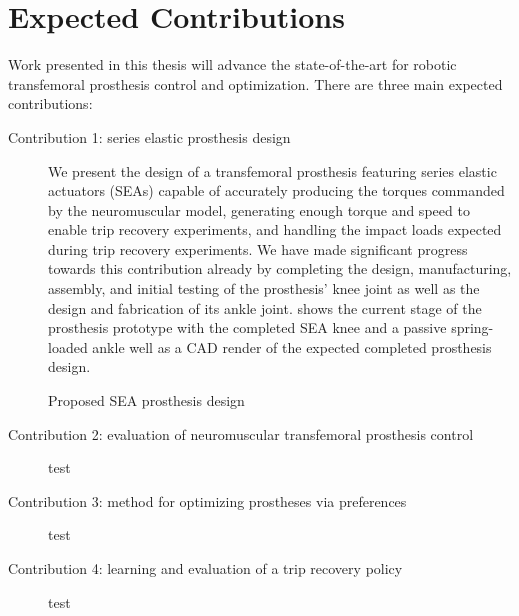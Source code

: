 \section{Expected Contributions}

Work presented in this thesis will advance the state-of-the-art for robotic
transfemoral prosthesis control and optimization. There are three main expected 
contributions: 

\begin{description}
    \item[Contribution 1: series elastic prosthesis design] We present the
    design of a transfemoral prosthesis featuring series elastic actuators
    (SEAs) capable of accurately producing the torques commanded by the
    neuromuscular model, generating enough torque and speed to enable trip
    recovery experiments, and handling the impact loads expected during trip
    recovery experiments. We have made significant progress towards this
    contribution already by completing the design, manufacturing, assembly, and
    initial testing of the prosthesis' knee joint as well as the design and
    fabrication of its ankle joint.  shows the
    current stage of the prosthesis prototype with the completed SEA knee and a
    passive spring-loaded ankle well as a CAD render of the expected completed
    prosthesis design.
    \begin{marginfigure}
        \centering
        \caption{Proposed SEA prosthesis design}
        \label{fig:prosthesis_design}
    \end{marginfigure}

    \item[Contribution 2: evaluation of neuromuscular transfemoral prosthesis control]
    test

    \item[Contribution 3: method for optimizing prostheses via preferences]
    test

    \item[Contribution 4: learning and evaluation of a trip recovery policy]
    test
\end{description}

